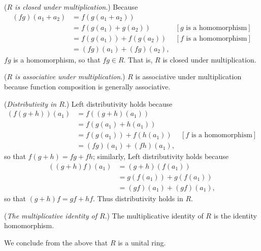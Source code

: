 \begin{enumerate}
      (\textit{$R$ is closed under multiplication}.) Because
      \begin{align*}
         (fg)(a_1 + a_2) &= f(g(a_1 + a_2)) \\
                     &=  f(g(a_1) + g(a_2)) &[g \text{ is a homomorphism}] \\
                     &=  f(g(a_1)) + f(g(a_2)) &[f \text{ is a homomorphism}] \\
                     &= (fg)(a_1) + (fg)(a_2),
      \end{align*}
      $fg$ is a homomorphism, so that $fg \in R$. That is, $R$ is closed under
      multiplication.

      (\textit{$R$ is associative under multiplication}.) $R$ is associative 
      under multiplication because function composition is generally 
      associative.

      (\textit{Distributivity in $R$}.) Left distributivity holds because
      \begin{align*}
         (f(g + h))(a_1) &= f((g + h)(a_1)) \\
            &= f(g(a_1) + h(a_1)) \\
            &= f(g(a_1)) + f(h(a_1)) &[f \text{ is a homomorphism}] \\
            &= (fg)(a_1) + (fh)(a_1),
      \end{align*}
      so that $f(g + h) = fg + fh$; similarly, Left distributivity holds because
      \begin{align*}
         ((g + h)f)(a_1) &= (g + h)(f(a_1)) \\
            &= g(f(a_1)) + g(f(a_1)) \\
            &= (gf)(a_1) + (gf)(a_1),
      \end{align*}
      so that $(g + h)f = gf + hf$. Thus distributivity holds in $R$.

      (\textit{The multiplicative identity of $R$}.) The multiplicative identity 
      of $R$ is the identity homomorphism.

      We conclude from the above that $R$ is a unital ring.


\end{enumerate}
